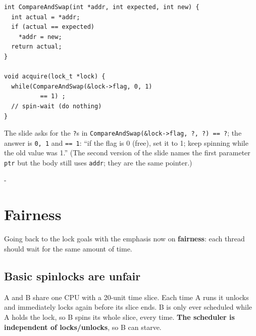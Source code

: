 \documentclass[11pt,a4paper]{article}
\makeatletter
\newcommand{\keepspace}[1]{\par\penalty-100\begingroup
  \setlength{\dimen@}{#1}\dimen@ii\pagegoal\advance\dimen@ii-\pagetotal
  \ifdim\dimen@>\dimen@ii\ifdim\dimen@ii>\z@\vfil\fi\break\fi\endgroup}
\newcommand{\blk}[5]{\draw[#4] (#1,0) rectangle (#2,1);
  \node[text=#5, font=\scriptsize\bfseries] at ({(#1+#2)/2},0.5) {#3};}
\newcommand{\ev}[2]{\node[font=\tiny, align=center, above] (e) at (#1,1.35) {#2};
  \draw[-{Latex[length=1.2mm]}] (#1,1.38) -- (#1,1.02);}
\newcommand{\evhi}[2]{\node[font=\tiny, above] at (#1,1.95) {#2};
  \draw[-{Latex[length=1.2mm]}] (#1,1.98) -- (#1,1.02);}
\newcommand{\spin}[2]{\node[font=\tiny, fill=black, text=white, inner sep=1.2pt] at ({(#1+#2)/2},1.22) {spin};}
\newcommand{\taxis}{\draw (0,-0.05) -- (160,-0.05);
  \foreach \t in {0,20,...,160} { \draw (\t,-0.05) -- (\t,-0.2); \node[below] at (\t,-0.15) {\t}; }}
\makeatother
\begin{document}
\begin{lstlisting}
int CompareAndSwap(int *addr, int expected, int new) {
  int actual = *addr;
  if (actual == expected)
    *addr = new;
  return actual;
}

void acquire(lock_t *lock) {
  while(CompareAndSwap(&lock->flag, 0, 1)
          == 1) ;
  // spin-wait (do nothing)
}
\end{lstlisting}

The slide asks for the \texttt{?}s in
\texttt{CompareAndSwap(\&lock->flag, ?, ?) == ?}; the answer is
\texttt{0, 1} and \texttt{== 1}: ``if the flag is 0 (free), set it to 1;
keep spinning while the old value was 1.'' (The second version of the slide
names the first parameter \texttt{ptr} but the body still uses
\texttt{addr}; they are the same pointer.)

\keepspace{16\baselineskip}
\section{Fairness}

Going back to the lock goals with the emphasis now on \textbf{fairness}:
each thread should wait for the same amount of time.

\subsection{Basic spinlocks are unfair}

\begin{center}
\end{center}

A and B share one CPU with a 20-unit time slice. Each time A runs it
unlocks and immediately locks again before its slice ends. B is only ever
scheduled while A holds the lock, so B spins its whole slice, every time.
\textbf{The scheduler is independent of locks/unlocks}, so B can starve.
\end{document}
